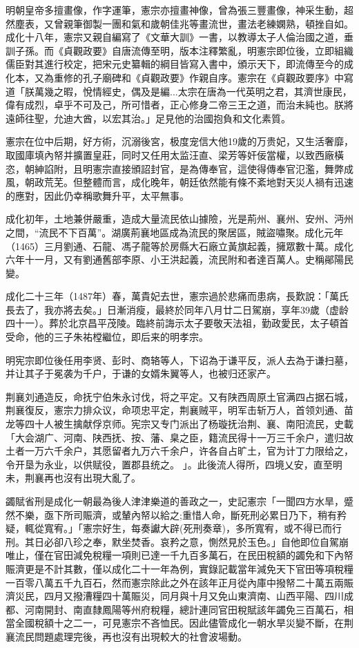 明朝皇帝多擅畫像，作字運筆，憲宗亦擅畫神像，曾為張三豐畫像，神采生動，超然塵表，又曾親筆御製一團和氣和歲朝佳兆等畫流世，畫法老練嫻熟，頓挫自如。成化十八年，憲宗又親自編寫了《文華大訓》一書，以教導太子人倫治國之道，垂訓子孫。而《貞觀政要》自唐流傳至明，版本注釋繁亂，明憲宗即位後，立即組織儒臣對其進行校定，把宋元史纂輯的綱目皆寫入書中，頒示天下，即流傳至今的成化本，又為重修的孔子廟碑和《貞觀政要》作親自序。憲宗在《貞觀政要序》中寫道「朕萬幾之暇，悅情經史，偶及是編...太宗在唐為一代英明之君，其濟世康民，偉有成烈，卓乎不可及己，所可惜者，正心修身二帝三王之道，而治未純也。朕將遠師往聖，允迪大酋，以宏其治。」足見他的治國抱負和文化素質。

憲宗在位中后期，好方術，沉溺後宮，极度宠信大他19歲的万贵妃，又生活奢靡，取國庫填內帑并擴置皇莊，同时又任用太监汪直、梁芳等奸佞當權，以致西廠橫恣，朝紳諂附，且明憲宗直接頒詔封官，是為傳奉官，這使得傳奉官氾濫，舞弊成風，朝政荒芜。但整體而言，成化晚年，朝廷依然能有條不紊地對天災人禍有迅速的應對，因此仍幸稱歌舞升平，太平無事。

成化初年，土地兼併嚴重，造成大量流民依山據險，光是荊州、襄州、安州、沔州之間，“流民不下百萬”。湖廣荊襄地區成為流民的聚居區，賊盜嘯聚。成化元年（1465）三月劉通、石龍、馮子龍等於房縣大石廠立黃旗起義，擁眾數十萬。成化六年十一月，又有劉通舊部李原、小王洪起義，流民附和者達百萬人。史稱鄖陽民變。

成化二十三年（1487年）春，萬貴妃去世，憲宗過於悲痛而患病，長歎說：「萬氏長去了，我亦將去矣。」日漸消瘦，最終於同年八月廿二日駕崩，享年39歲（虚龄四十一）。葬於北京昌平茂陵。臨終前誨示太子要敬天法祖，勤政愛民，太子頓首受命，他的三子朱祐樘繼位，即后来的明孝宗。

明宪宗即位後任用李贤、彭时、商辂等人，下诏為于谦平反，派人去為于谦扫墓，并让其子于冕袭为千户，于谦的女婿朱翼等人，也被归还家产。

荆襄刘通造反，命抚宁伯朱永讨伐，将之平定。又有陕西周原土官满四占据石城，荆襄復反，憲宗力排众议，命项忠平定，荆襄贼平，明军击斩万人，首领刘通、苗龙等四十人被生擒献俘京师。宪宗又专门派出了杨璇抚治荆、襄、南阳流民，史載「大会湖广、河南、陕西抚、按、藩、臬之臣，籍流民得十一万三千余户，遣归故土者一万六千余户，其愿留者九万六千余户，许各自占旷土，官为计丁力限给之，令开垦为永业，以供赋役，置郡县统之。 」。此後流人得所，四境乂安，直至明未，荆襄再也沒有出現大亂了。

蠲賦省刑是成化一朝最為後人津津樂道的善政之一，史記憲宗「一聞四方水旱，蹙然不樂，亟下所司賑濟，或輦內帑以給之;重惜人命，斷死刑必累日乃下，稍有矜疑，輒從寬宥。」「憲宗好生，每奏讞大辟(死刑奏章)，多所寬宥，或不得已而行刑。其日必卻八珍之奉，默坐焚香。哀矜之意，惻然見於玉色。」自他即位自駕崩唯止，僅在官田減免稅糧一項則已達一千九百多萬石，在民田稅額的蠲免和下內帑賑濟更是不計其數，僅以成化二十一年為例，實錄記載當年減免天下官田等項稅糧一百零八萬五千九百石，然而憲宗除此之外在該年正月從內庫中撥帑二十萬五兩賑濟災民，四月又撥漕糧四十萬賑災，同月與十月又免山東濟南、山西平陽、四川成都、河南開封、南直隸鳳陽等州府稅糧，總計連同官田稅賦該年蠲免三百萬石，相當全國稅額十之二一，可見憲宗不吝恤民。因此儘管成化一朝水旱災變不斷，在荆襄流民問題處理完後，再也沒有出現較大的社會波場動。

